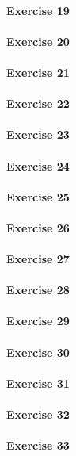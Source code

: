\paragraph{Exercise 19}
\paragraph{Exercise 20}
\paragraph{Exercise 21}
\paragraph{Exercise 22}
\paragraph{Exercise 23}
\paragraph{Exercise 24}
\paragraph{Exercise 25}
\paragraph{Exercise 26}
\paragraph{Exercise 27}
\paragraph{Exercise 28}
\paragraph{Exercise 29}
\paragraph{Exercise 30}
\paragraph{Exercise 31}
\paragraph{Exercise 32}
\paragraph{Exercise 33}
